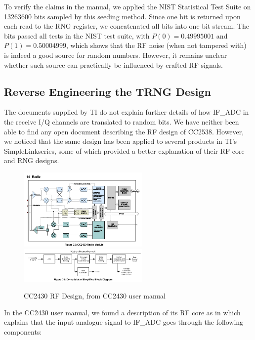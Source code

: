 To verify the claims in the manual, we applied the NIST Statistical Test Suite\cite{NISTTest} on 13263600 bits sampled by this seeding method. Since one bit is returned upon each read to the RNG register, we concatenated all bits into one bit stream. The bits passed all tests in the NIST test suite, with $P(0) = 0.49995001$ and $P(1) = 0.50004999$, which shows that the RF noise (when not tampered with) is indeed a good source for random numbers. However, it remains unclear whether such source can practically be influenced by crafted RF signals. %


\subsection{Reverse Engineering the TRNG Design}
The documents supplied by TI do not explain further details of how IF\_ADC in the receive I/Q channels are translated to random bits. We have neither been able to find any open document describing the RF design of CC2538. However, we noticed that the same design has been applied to several products in TI's SimpleLink\texttrademark series, some of which provided a better explanation of their RF core and RNG designs. 

\begin{figure}[!t]
\centering
\includegraphics[width=2.5in]{fig/CC2430_Radio.png}
\includegraphics[width=2.5in]{fig/CC2430_Demodulator.png}
\caption{CC2430 RF Design, from CC2430 user manual\cite{CC2430Manual}}
\label{CC2430RF}
\end{figure}

In the CC2430 user manual\cite{CC2430Manual}, we found a description of its RF core as in  which explains that the input analogue signal to IF\_ADC goes through the following components:

